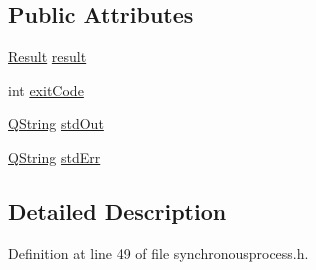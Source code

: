 \subsection*{\-Public \-Attributes}
\begin{DoxyCompactItemize}
\item 
\hyperlink{struct_utils_1_1_synchronous_process_response_aa7b2d882cf93d074f4392e57a6603f2c}{\-Result} \hyperlink{struct_utils_1_1_synchronous_process_response_a292da97b1219d5bf29bdcc96ddeaee91}{result}
\item 
int \hyperlink{struct_utils_1_1_synchronous_process_response_addc9fc8217e8275e96b9426afc976a21}{exit\-Code}
\item 
\hyperlink{group___u_a_v_objects_plugin_gab9d252f49c333c94a72f97ce3105a32d}{\-Q\-String} \hyperlink{struct_utils_1_1_synchronous_process_response_a84040de73bca35b34e0d0f0069c849b5}{std\-Out}
\item 
\hyperlink{group___u_a_v_objects_plugin_gab9d252f49c333c94a72f97ce3105a32d}{\-Q\-String} \hyperlink{struct_utils_1_1_synchronous_process_response_a328fa8fa6a704de6827a005d7e00bd82}{std\-Err}
\end{DoxyCompactItemize}


\subsection{\-Detailed \-Description}


\-Definition at line 49 of file synchronousprocess.\-h.



